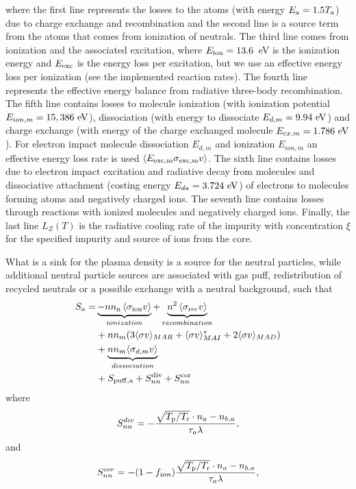 \documentclass[amsmath,amssymb,a4]{revtex4-2}
\begin{document}
where the first line represents the losses to the atoms (with energy $E_{\rm a}=1.5T_{\rm a}$) due to charge exchange and recombination and the second line is a source term from the atoms that comes from ionization of neutrals. The third line comes from ionization and the associated excitation, where $E_{\rm ion} = 13.6$~eV is the ionization energy and $E_{\rm exc}$ is the energy loss per excitation, but we use an effective energy loss per ionization (see the implemented reaction rates). The fourth line represents the effective energy balance from radiative three-body recombination. The fifth line contains losses to molecule ionization (with ionization potential $E_{ion,m}=15,386~{\rm eV}$), dissociation (with energy to dissociate $E_{d,m}=9.94~{\rm eV}$) and charge exchange (with energy of the charge exchanged molecule $E_{cx,m}=1.786~{\rm eV}$). For electron impact molecule dissociation $E_{d,m}$ and ionization $E_{ion,m}$ an effective energy loss rate is used $\langle E_{\rm exc,m}\sigma_{\rm exc,m} v\rangle$. The sixth line contains losses due to electron impact excitation and radiative decay from molecules and dissociative attachment (costing energy $E_{da}=3.724~{\rm eV}$) of electrons to molecules forming atoms and negatively charged ions. The seventh line contains losses through reactions with ionized molecules and negatively charged ions.
Finally, the last line $L_Z(T)$ is the radiative cooling rate of the impurity with concentration $\xi$ for the specified impurity and source of ions from the core.

What is a sink for the plasma density is a source for the neutral particles, while additional neutral particle sources are associated with gas puff, redistribution of recycled neutrals or a possible exchange with a neutral background, such that
\begin{equation}\label{neutral_source}
\begin{aligned}
        S_a=&\underbrace{-n n_{\mathrm{n}}\left\langle\sigma_{\mathrm{ion}} v\right\rangle}_{ionization} +\underbrace{n^2\left\langle\sigma_{\mathrm{rec}} v\right\rangle}_{recombination} \\
        & + nn_m(3\langle\sigma v \rangle_{MAR} + \langle\sigma v \rangle_{MAI}^* + 2\langle\sigma v \rangle_{MAD}) \\
        &+ \underbrace{nn_m\langle\sigma_{d,m} v\rangle}_{dissociation}
        \\
        &+ S_{\rm puff,a} + S_{nn}^{\rm div} + S_{nn}^{\rm cor} 
\end{aligned}
\end{equation}
where 
\begin{equation}
    S_{nn}^{div} = - \frac{\sqrt{{T_{\rm p}}/{T_{\rm r}}}\cdot n_a-n_{b,a}}{\tau_a\lambda},
\end{equation}
and 
\begin{equation}
    S_{nn}^{cor} = - (1-f_{ion})\frac{\sqrt{{T_{\rm p}}/{T_{\rm r}}}\cdot n_a-n_{b,a}}{\tau_a\lambda},
\end{equation}
\end{document}
